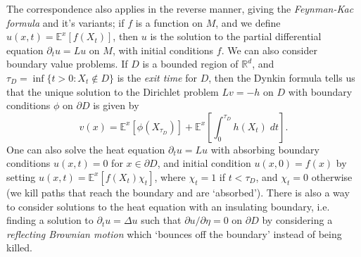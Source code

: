 \documentclass[12pt]{article}
\newcommand*{\R}{\mathbb{R}}
\begin{document}
The correspondence also applies in the reverse manner, giving the \emph{Feynman-Kac formula} and it's variants; if $f$ is a function on $M$, and we define $u(x,t) = \mathbb{E}^x[f(X_t)]$, then $u$ is the solution to the partial differential equation $\partial_t u = Lu$ on $M$, with initial conditions $f$.
We can also consider boundary value problems. If $D$ is a bounded region of $\R^d$, and $\tau_D = \inf \{ t > 0 : X_t \not \in D \}$ is the \emph{exit time} for $D$, then the Dynkin formula tells us that the unique solution to the Dirichlet problem $Lv = -h$ on $D$ with boundary conditions $\phi$ on $\partial D$ is given by
%
\[ v(x) = \mathbb{E}^x[\phi(X_{\tau_D})] + \mathbb{E}^x \left[ \int_0^{\tau_D} h(X_t)\; dt \right]. \]
%
One can also solve the heat equation $\partial_t u = Lu$ with absorbing boundary conditions $u(x,t) = 0$ for $x \in \partial D$, and initial condition $u(x,0) = f(x)$ by setting $u(x,t) = \mathbb{E}^x[f(X_t) \chi_t ]$, where $\chi_t = 1$ if $t < \tau_D$, and $\chi_t = 0$ otherwise (we kill paths that reach the boundary and are `absorbed'). %
%
%
There is also a way to consider solutions to the heat equation with an insulating boundary, i.e. finding a solution to $\partial_t u = \Delta u$ such that $\partial u / \partial \eta = 0$ on $\partial D$ by considering a \emph{reflecting Brownian motion} which `bounces off the boundary' instead of being killed.
\end{document}
